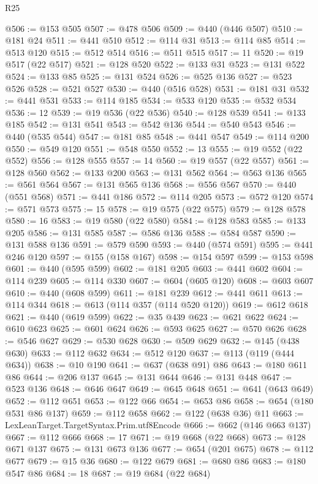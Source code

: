\begin{lexlean}{R25}
\begin{coremodule}
@506 := @153 @505
@507 := @478 @506
@509 := @440 (@446 @507)
@510 := @181 @24
@511 := @441 @510
@512 := @114 @31
@513 := @114 @85
@514 := @513 @120
@515 := @512 @514
@516 := @511 @515
@517 := 11
@520 := @19 @517 (@22 @517)
@521 := @128 @520
@522 := @133 @31
@523 := @131 @522
@524 := @133 @85
@525 := @131 @524
@526 := @525 @136
@527 := @523 @526
@528 := @521 @527
@530 := @440 (@516 @528)
@531 := @181 @31
@532 := @441 @531
@533 := @114 @185
@534 := @533 @120
@535 := @532 @534
@536 := 12
@539 := @19 @536 (@22 @536)
@540 := @128 @539
@541 := @133 @185
@542 := @131 @541
@543 := @542 @136
@544 := @540 @543
@546 := @440 (@535 @544)
@547 := @181 @85
@548 := @441 @547
@549 := @114 @200
@550 := @549 @120
@551 := @548 @550
@552 := 13
@555 := @19 @552 (@22 @552)
@556 := @128 @555
@557 := 14
@560 := @19 @557 (@22 @557)
@561 := @128 @560
@562 := @133 @200
@563 := @131 @562
@564 := @563 @136
@565 := @561 @564
@567 := @131 @565 @136
@568 := @556 @567
@570 := @440 (@551 @568)
@571 := @441 @186
@572 := @114 @205
@573 := @572 @120
@574 := @571 @573
@575 := 15
@578 := @19 @575 (@22 @575)
@579 := @128 @578
@580 := 16
@583 := @19 @580 (@22 @580)
@584 := @128 @583
@585 := @133 @205
@586 := @131 @585
@587 := @586 @136
@588 := @584 @587
@590 := @131 @588 @136
@591 := @579 @590
@593 := @440 (@574 @591)
@595 := @441 @246 @120
@597 := @155 (@158 @167)
@598 := @154 @597
@599 := @153 @598
@601 := @440 (@595 @599)
@602 := @181 @205
@603 := @441 @602
@604 := @114 @239
@605 := @114 @330
@607 := @604 (@605 @120)
@608 := @603 @607
@610 := @440 (@608 @599)
@611 := @181 @239
@612 := @441 @611
@613 := @114 @344
@618 := @613 (@114 @357 (@114 @520 @120))
@619 := @612 @618
@621 := @440 (@619 @599)
@622 := @35 @439
@623 := @621 @622
@624 := @610 @623
@625 := @601 @624
@626 := @593 @625
@627 := @570 @626
@628 := @546 @627
@629 := @530 @628
@630 := @509 @629
@632 := @145 (@438 @630)
@633 := @112 @632
@634 := @512 @120
@637 := @113 (@119 (@444 @634))
@638 := @10 @190
@641 := @637 (@638 @91) @86
@643 := @180 @611 @86
@644 := @206 @137
@645 := @131 @644
@646 := @131 @448
@647 := @523 @136
@648 := @646 @647
@649 := @645 @648
@651 := @641 (@643 @649)
@652 := @112 @651
@653 := @122 @66
@654 := @653 @86
@658 := @654 (@180 @531 @86 @137)
@659 := @112 @658
@662 := @122 (@638 @36) @11
@663 := LexLeanTarget.TargetSyntax.Prim.utf8Encode
@666 := @662 (@146 @663 @137)
@667 := @112 @666
@668 := 17
@671 := @19 @668 (@22 @668)
@673 := @128 @671 @137
@675 := @131 @673 @136
@677 := @654 (@201 @675)
@678 := @112 @677
@679 := @15 @36
@680 := @122 @679
@681 := @680 @86
@683 := @180 @547 @86
@684 := 18
@687 := @19 @684 (@22 @684)

\end{coremodule}
\end{lexlean}
